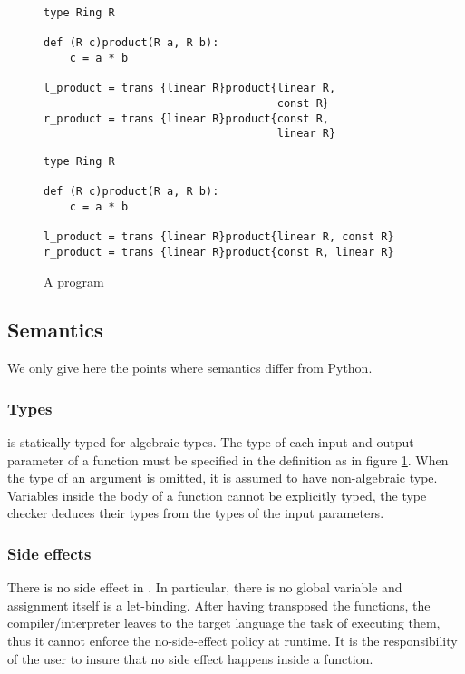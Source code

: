 \begin{figure}[!ht]
  \centering
\ifafive
\begin{lstlisting}
type Ring R

def (R c)product(R a, R b):
    c = a * b
  
l_product = trans {linear R}product{linear R,
                                    const R}
r_product = trans {linear R}product{const R,
                                    linear R}
\end{lstlisting}
\else
\begin{lstlisting}
type Ring R

def (R c)product(R a, R b):
    c = a * b
  
l_product = trans {linear R}product{linear R, const R}
r_product = trans {linear R}product{const R, linear R}
\end{lstlisting}
\fi 
  \caption{A \tALpy{} program}
  \label{fig:prog}
\end{figure}

\ifbfive\pagebreak\fi
\subsection{Semantics}
We only give here the points where \tALpy{} semantics differ from
Python.

\subsubsection{Types}
\tALpy{} is statically typed for algebraic types. The type of each
input and output parameter of a function must be specified in the
definition as in figure \ref{fig:prog}. When the type of an argument
is omitted, it is assumed to have non-algebraic type. Variables inside
the body of a function cannot be explicitly typed, the type checker
deduces their types from the types of the input parameters.

\subsubsection{Side effects}
There is no side effect in \tALpy{}. In particular, there is no global
variable and assignment itself is a let-binding. After having
transposed the functions, the \tALpy{} compiler/interpreter leaves to
the target language the task of executing them, thus it cannot enforce
the no-side-effect policy at runtime. It is the responsibility of the
user to insure that no side effect happens inside a \tALpy{} function.

